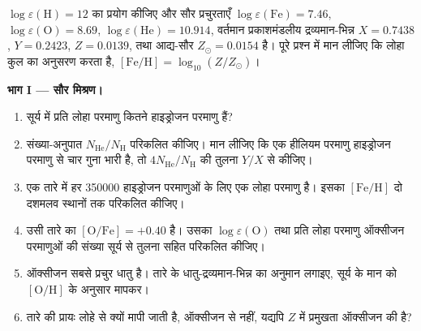 \begin{problem}[{सप्ताहांत समस्या --- सौर मिश्रण से दीर्घजीवी तारों की
धात्विकताओं तक}]
\label{pb:b3:origin-of-elements:1}
$\log\varepsilon(\mathrm{H}) = 12$ का प्रयोग कीजिए और सौर प्रचुरताएँ
$\log\varepsilon(\mathrm{Fe}) = 7.46$, $\log\varepsilon(\mathrm{O}) =
8.69$, $\log\varepsilon(\mathrm{He}) = 10.914$, वर्तमान प्रकाशमंडलीय
द्रव्यमान-भिन्न $X = 0.7438$, $Y = 0.2423$, $Z = 0.0139$,
तथा आद्य-सौर $Z_\odot = 0.0154$ है। पूरे प्रश्न में मान लीजिए कि लोहा
कुल  का अनुसरण करता है, $[\mathrm{Fe/H}] = \log_{10}(Z/Z_\odot)$।

\medskip\noindent\textbf{भाग I --- सौर मिश्रण।}
\begin{enumerate}
\item सूर्य में प्रति लोहा परमाणु कितने हाइड्रोजन परमाणु हैं?
\item संख्या-अनुपात $N_\mathrm{He}/N_\mathrm{H}$ परिकलित कीजिए। मान लीजिए कि एक
  हीलियम परमाणु हाइड्रोजन परमाणु से चार गुना भारी है, तो $4N_\mathrm{He}/N_\mathrm{H}$ की तुलना
  $Y/X$ से कीजिए।
\item एक तारे में हर \num{350000} हाइड्रोजन परमाणुओं के लिए एक लोहा परमाणु है।
  इसका $[\mathrm{Fe/H}]$ दो दशमलव स्थानों तक परिकलित कीजिए।
\item उसी तारे का $[\mathrm{O/Fe}] = +0.40$ है। उसका
  $\log\varepsilon(\mathrm{O})$ तथा प्रति लोहा परमाणु ऑक्सीजन परमाणुओं की संख्या
  सूर्य से तुलना सहित परिकलित कीजिए।
\item ऑक्सीजन सबसे प्रचुर धातु है। तारे के धातु-द्रव्यमान-भिन्न का
  अनुमान लगाइए, सूर्य के मान को $[\mathrm{O/H}]$ के अनुसार मापकर।
\item तारे की  प्रायः लोहे से क्यों मापी जाती है,
  ऑक्सीजन से नहीं, यद्यपि $Z$ में प्रमुखता ऑक्सीजन की है?
\end{enumerate}


\end{problem}
